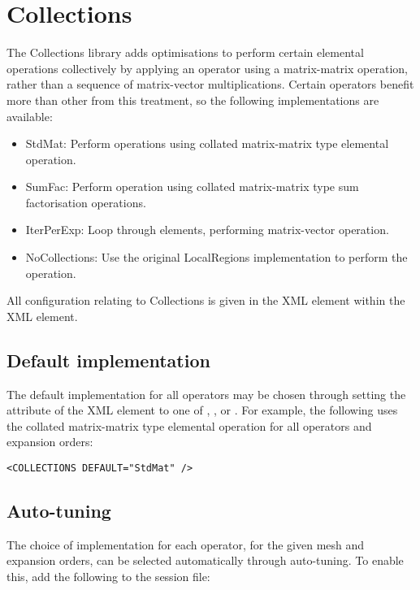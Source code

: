 

\section{Collections}
The Collections library adds optimisations to perform certain elemental
operations collectively by applying an operator using a matrix-matrix operation,
rather than a sequence of matrix-vector multiplications. Certain operators
benefit more than other from this treatment, so the following implementations
are available:
\begin{itemize}
    \item StdMat: Perform operations using collated matrix-matrix type elemental
        operation.
    \item SumFac: Perform operation using collated matrix-matrix type sum
        factorisation operations.
    \item IterPerExp: Loop through elements, performing matrix-vector operation.
    \item NoCollections: Use the original LocalRegions implementation to
        perform the operation.
\end{itemize}
All configuration relating to Collections is given in the 
XML element within the  XML element.

\subsection{Default implementation}
The default implementation for all operators may be chosen through setting the
 attribute of the  XML element to one of
, ,  or . For
example, the following uses the collated matrix-matrix type elemental operation
for all operators and expansion orders:

\begin{lstlisting}[style=XmlStyle]
<COLLECTIONS DEFAULT="StdMat" />
\end{lstlisting}

\subsection{Auto-tuning}
The choice of implementation for each operator, for the given mesh and
expansion orders, can be selected automatically through 
auto-tuning. To enable this, add the following to the \nekpp session
file:

